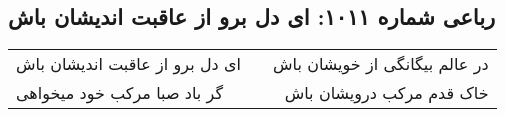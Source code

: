\begin{center}
\section*{رباعی شماره ۱۰۱۱: ای دل برو از عاقبت اندیشان باش}
\label{sec:1011}
\begin{longtable}{l p{0.5cm} r}
ای دل برو از عاقبت اندیشان باش
&&
در عالم بیگانگی از خویشان باش
\\
گر باد صبا مرکب خود میخواهی
&&
خاک قدم مرکب درویشان باش
\\
\end{longtable}
\end{center}
